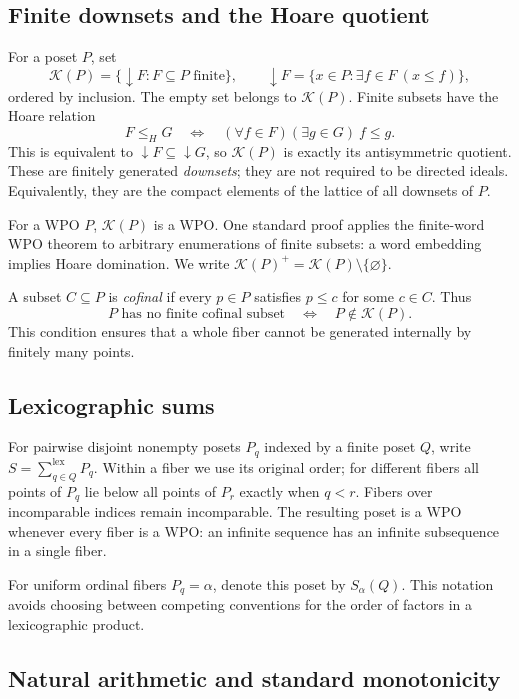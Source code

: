 \documentclass[11pt,a4paper]{article}
\theoremstyle{definition}
\theoremstyle{remark}
\newcommand{\K}{\mathcal K}
\begin{document}
\subsection{Finite downsets and the Hoare quotient}

For a poset $P$, set
\[
 \K(P)=\{\downarrow F:F\subseteq P\text{ finite}\},
 \qquad
 \downarrow F=\{x\in P:\exists f\in F\ (x\le f)\},
\]
ordered by inclusion. The empty set belongs to $\K(P)$. Finite subsets have
the Hoare relation
\[
 F\le_H G\quad\Longleftrightarrow\quad
 (\forall f\in F)(\exists g\in G)\ f\le g.
\]
This is equivalent to $\downarrow F\subseteq\downarrow G$, so $\K(P)$ is
exactly its antisymmetric quotient. These are finitely generated
\emph{downsets}; they are not required to be directed ideals. Equivalently,
they are the compact elements of the lattice of all downsets of $P$.

For a WPO $P$, $\K(P)$ is a WPO. One standard proof applies the finite-word
WPO theorem to arbitrary enumerations of finite subsets: a word embedding
implies Hoare domination. We write
$\K(P)^+=\K(P)\setminus\{\varnothing\}$.

A subset $C\subseteq P$ is \emph{cofinal} if every $p\in P$ satisfies
$p\le c$ for some $c\in C$. Thus
\begin{equation}\label{eq:nofinite}
 P\text{ has no finite cofinal subset}
 \quad\Longleftrightarrow\quad P\notin\K(P).
\end{equation}
This condition ensures that a whole fiber cannot be generated internally
by finitely many points.

\subsection{Lexicographic sums}

For pairwise disjoint nonempty posets $P_q$ indexed by a finite poset $Q$,
write $S=\sum_{q\in Q}^{\mathrm{lex}}P_q$. Within a fiber we use its original
order; for different fibers all points of $P_q$ lie below all points of
$P_r$ exactly when $q<r$. Fibers over incomparable indices remain
incomparable. The resulting poset is a WPO whenever every fiber is a WPO:
an infinite sequence has an infinite subsequence in a single fiber.

For uniform ordinal fibers $P_q=\alpha$, denote this poset by
$S_\alpha(Q)$. This notation avoids choosing between competing conventions
for the order of factors in a lexicographic product.

\subsection{Natural arithmetic and standard monotonicity}
\end{document}
